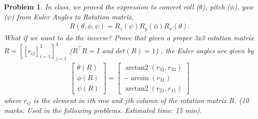 \documentclass[twocolumn]{article}
\newtheorem{prob}{Problem}
\newif\ifsol
\DeclareMathOperator{\arctantwo}{arctan2}
\begin{document}
\ifsol
\paragraph*{Solution}
Please look at the function \verb|is_valid_rot| in file \verb|hw1.cpp|.
\fi

\begin{prob}
  In class, we proved the expression to convert roll ($\theta$), pitch
  ($\phi$), yaw ($\psi$) from Euler Angles to Rotation matrix,
  \begin{align}
    R(\theta, \phi, \psi) = R_z(\psi) R_y(\phi) R_x(\theta).
  \end{align}
  What if we want to do the inverse? Prove that given a proper 3x3 rotation
  matrix $R = [[r_{ij}]_{i=1}^3]_{j=1}^3$ ($R^\top R = I$ and $det(R) = 1$) , the Euler angles are given by
  \begin{align}
    \begin{bmatrix}
    \theta(R) \\
    \phi(R) \\
    \psi(R)
    \end{bmatrix}
    = \begin{bmatrix}
      \arctantwo(r_{32}, r_{33}) \\
      -\arcsin(r_{31}) \\
      \arctantwo(r_{21}, r_{11})
      \end{bmatrix}
  \end{align}
  where $r_{ij}$ is the element in $i$th row and $j$th column of the rotation
  matrix $R$. (10 marks. Used in the
  following problems. Estimated time: 15 min).
\end{prob}

\ifsol
\end{document}
